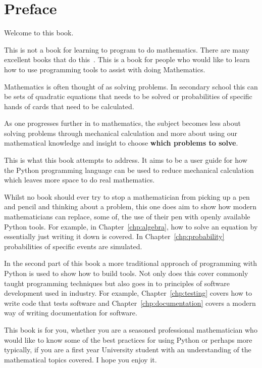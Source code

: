 \chapter*{Preface}


Welcome to this book.

This is not a book for learning to program to do mathematics. There are
many excellent books that do this~\cite{bautista2014mathematics, morley2022applying,  saha2015doing}. 
This is a book for people who would
like to learn how to use programming tools to assist with doing Mathematics.

Mathematics is often thought of as solving problems. In secondary school this can
be sets of quadratic equations that needs to be solved or probabilities of
specific hands of cards that need to be calculated.

As one progresses further in to mathematics, the subject becomes less about
solving problems through mechanical calculation and more about using our
mathematical knowledge and insight to choose \textbf{which problems to solve}.

This is what this book attempts to address. It aims to be a user guide for how
the Python programming language can be used to reduce mechanical calculation
which leaves more space to do real mathematics.

Whilst no book should ever try to stop a mathematician from picking up a pen and
pencil and thinking about a problem, this one does aim to show how modern
mathematicians can replace, some of, the use of their pen with openly available
Python tools. For example, in Chapter~\ref{chp:algebra}, how to solve an equation by essentially
just writing it down is covered. In Chapter~\ref{chp:probability} probabilities
of specific events are simulated.

In the second part of this book a more traditional approach of programming with
Python is used to show how to build tools. Not only does this cover commonly
taught programming techniques but also goes in to principles of software
development used in industry. For example, Chapter~\ref{chp:testing} covers how
to write code that tests software and Chapter~\ref{chp:documentation} covers a
modern way of writing documentation for software.

This book is for you, whether you are a seasoned professional mathematician who
would like to know some of the best practices for using Python or perhaps more
typically, if you are a first year University student with an understanding of
the mathematical topics covered. I hope you enjoy it.
